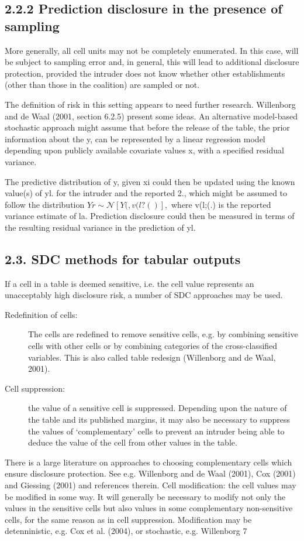 \subsection*{2.2.2 Prediction disclosure in the presence of sampling}
More generally, all cell units may not be completely enumerated. In this case,  will
be subject to sampling error and, in general, this will lead to additional disclosure
protection, provided the intruder does not know whether other establishments (other than
those in the coalition) are sampled or not. 

The definition of risk in this setting appears to
need further research. Willenborg and de Waal (2001, section 6.2.5) present some ideas.
An alternative model-based stochastic approach might assume that before the release of
the table, the prior information about the y, can be represented by a linear regression
model depending upon publicly available covariate values x, with a speciﬁed residual
variance. 

The predictive distribution of y, given xi could then be updated using the
known value(s) of yl. for the intruder and the reported 2., which might be assumed to
follow the distribution $Yr \sim \mathcal{N} [Y(,v(l?()],$ where v(l;(.) is the reported variance estimate of
la. Prediction disclosure could then be measured in terms of the resulting residual
variance in the prediction of yl.
\subsection*{2.3. SDC methods for tabular outputs}
If a cell in a table is deemed sensitive, i.e. the cell value represents an unacceptably high
disclosure risk, a number of SDC approaches may be used.
\begin{description}
\item[Redefinition of cells:] The cells are redefined to remove sensitive cells, e.g. by combining
sensitive cells with other cells or by combining categories of the cross-classified
variables. This is also called table redesign (Willenborg and de Waal, 2001).
\item[Cell suppression:] the value of a sensitive cell is suppressed. Depending upon the nature
of the table and its published margins, it may also be necessary to suppress the values of
‘complementary’ cells to prevent an intruder being able to deduce the value of the cell
from other values in the table. 
\end{description}
There is a large literature on approaches to choosing
complementary cells which ensure disclosure protection. See e.g. Willenborg and de
Waal (2001), Cox (2001) and Giessing (2001) and references therein.
Cell modification: the cell values may be modiﬁed in some way. It will generally be
necessary to modify not only the values in the sensitive cells but also values in some
complementary non-sensitive cells, for the same reason as in cell suppression.
Modification may be detenninistic, e.g. Cox et al. (2004), or stochastic, e.g. Willenborg
7
